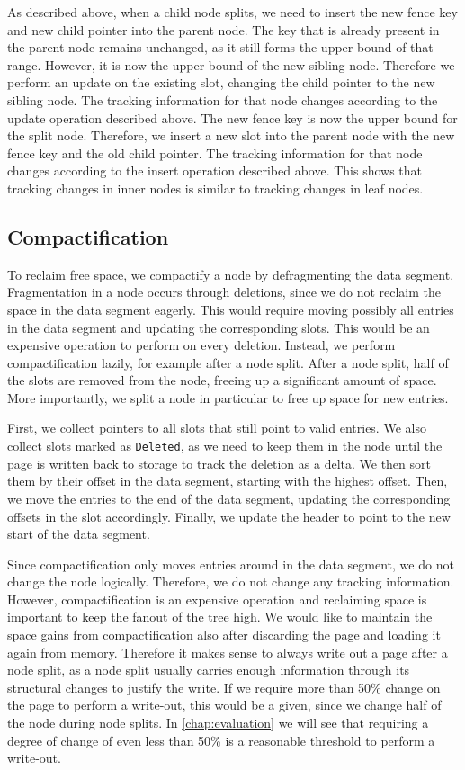 As described above, when a child node splits, we need to insert the new fence key and new child pointer into the parent node.
The key that is already present in the parent node remains unchanged, as it still forms the upper bound of that range.
However, it is now the upper bound of the new sibling node. Therefore we perform an update on the existing slot, changing the child pointer to the new sibling node.
The tracking information for that node changes according to the update operation described above.
The new fence key is now the upper bound for the split node. 
Therefore, we insert a new slot into the parent node with the new fence key and the old child pointer.
The tracking information for that node changes according to the insert operation described above.
This shows that tracking changes in inner nodes is similar to tracking changes in leaf nodes.

\subsection*{Compactification}
To reclaim free space, we compactify a node by defragmenting the data segment.
Fragmentation in a node occurs through deletions, since we do not reclaim the space in the data segment eagerly.
This would require moving possibly all entries in the data segment and updating the corresponding slots.
This would be an expensive operation to perform on every deletion.
Instead, we perform compactification lazily, for example after a node split.
After a node split, half of the slots are removed from the node, freeing up a significant amount of space.
More importantly, we split a node in particular to free up space for new entries.

First, we collect pointers to all slots that still point to valid entries.
We also collect slots marked as \texttt{Deleted}, as we need to keep them in the node until the page is written back to storage to track the deletion as a delta.
We then sort them by their offset in the data segment, starting with the highest offset.
Then, we move the entries to the end of the data segment, updating the corresponding offsets in the slot accordingly.
Finally, we update the header to point to the new start of the data segment.

Since compactification only moves entries around in the data segment, we do not change the node logically.
Therefore, we do not change any tracking information.
However, compactification is an expensive operation and reclaiming space is important to keep the fanout of the tree high.
We would like to maintain the space gains from compactification also after discarding the page and loading it again from memory.
Therefore it makes sense to always write out a page after a node split, as a node split usually carries enough information through its structural changes to justify the write.
If we require more than 50\% change on the page to perform a write-out, this would be a given, since we change half of the node during node splits.
In \autoref{chap:evaluation} we will see that requiring a degree of change of even less than 50\% is a reasonable threshold to perform a write-out.

